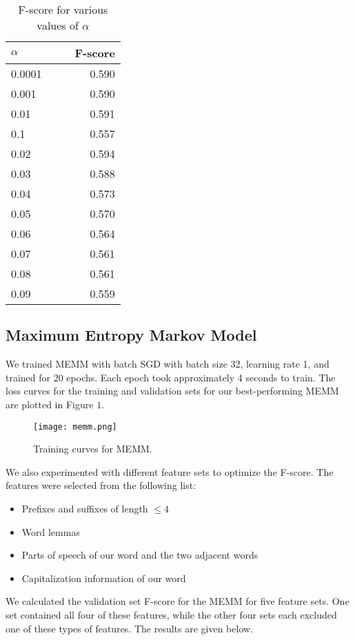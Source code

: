 \documentclass[11pt]{article}
\begin{document}
\begin{table}[h]
  \centering
  \begin{tabular}{lccr}
  \toprule
  $\alpha$ & & & F-score \\
  \midrule
  0.0001 & & & 0.590 \\
  0.001 & & & 0.590 \\
  0.01 & & & 0.591 \\
  0.1 & & & 0.557 \\
  0.02 & & & 0.594 \\
  0.03 & & & 0.588 \\
  0.04 & & & 0.573 \\
  0.05 & & & 0.570 \\
  0.06 & & & 0.564 \\
  0.07 & & & 0.561 \\
  0.08 & & & 0.561 \\
  0.09 & & & 0.559 \\
  \end{tabular}
  \caption{\label{tab:alpha} F-score for various values of $\alpha$}
\end{table}

\subsection{Maximum Entropy Markov Model}

We trained MEMM with batch SGD with batch size 32, learning rate 1, and trained for 20 epochs. Each epoch took approximately 4 seconds to train. The loss curves for the training and validation sets for our best-performing MEMM are plotted in Figure $1$. 

\begin{figure}[h]
\centering
\texttt{[image: memm.png]}
\caption{Training curves for MEMM.}
\end{figure}

We also experimented with different feature sets to optimize the F-score. The features were selected from the following list:
\begin{itemize}
  \item Prefixes and suffixes of length $\leq 4$
  \item Word lemmas
  \item Parts of speech of our word and the two adjacent words
  \item Capitalization information of our word
\end{itemize}

We calculated the validation set F-score for the MEMM for five feature sets. One set contained all four of these features, while the other four sets each excluded one of these types of features. The results are given below. 
\end{document}
